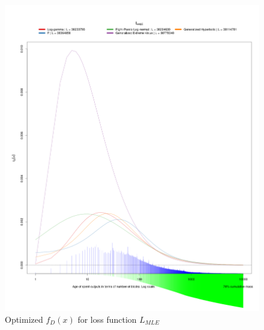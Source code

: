 \documentclass[english]{article}
\begin{document}
\begin{figure}
\caption{Optimized $f_{D}(x)$ for loss function $L_{MLE}$}

\includegraphics[scale=0.35]{images/dry-run/estimate/estimate-L_MLE-flavor-0}
\end{figure}
\end{document}
